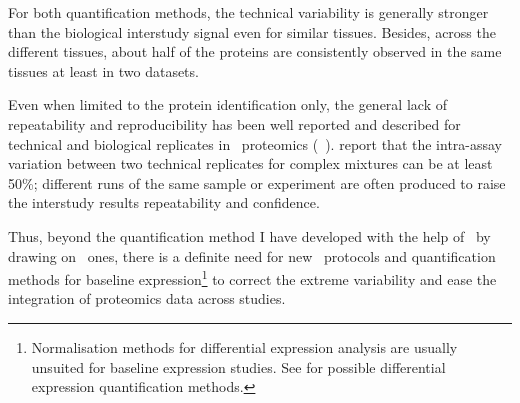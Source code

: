 For both quantification methods,
the technical variability is generally stronger
than the biological interstudy signal even for similar tissues.
Besides, across the different tissues,
about half of the proteins are consistently observed
in the same tissues at least in two datasets.\mybr\

Even when limited to the protein identification only,
the general lack of repeatability and reproducibility
has been well reported and described
for technical and biological replicates in \ms\ proteomics
(\eg\ \citet{Tu2014-yj,Tabb2010-ro}).
\citet{Canterbury2014-oi} report that
the intra-assay variation between two technical replicates for complex mixtures
can be at least 50\%;
different runs of the same sample or experiment are often produced to raise
the interstudy results repeatability and confidence.\mybr\

Thus, beyond the quantification method
I have developed with the help of \james\ by drawing on \Rnaseq\ ones,
there is a definite need for new \ms\ protocols and quantification methods
for baseline expression\footnote{Normalisation methods for differential expression
analysis are usually unsuited for baseline expression studies.
See \citet{Valikangas2018-yj} for possible differential expression quantification
methods.} to correct the extreme variability
and ease the integration of proteomics data across studies.



